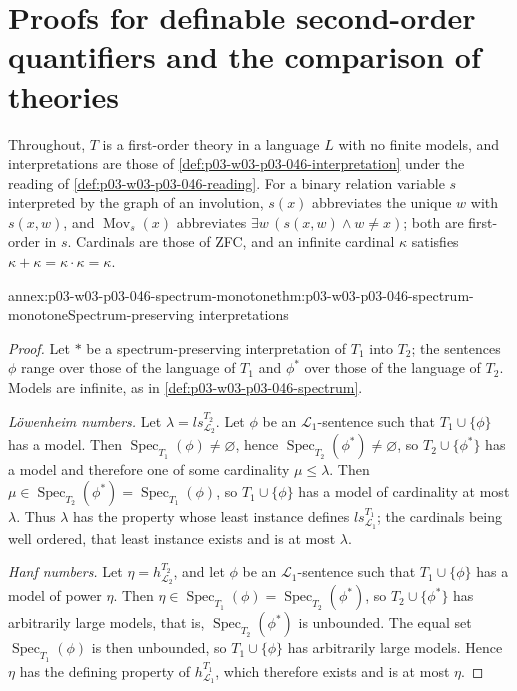 \section{Proofs for definable second-order quantifiers and the comparison of theories}
\label{sec:annex-p03-w03-p03-046-dsoq}

Throughout, \(T\) is a first-order theory in a language \(L\) with no finite
models, and interpretations are those of
\cref{def:p03-w03-p03-046-interpretation} under the reading of
\cref{def:p03-w03-p03-046-reading}. For a binary relation variable \(s\)
interpreted by the graph of an involution, \(s(x)\) abbreviates the unique
\(w\) with \(s(x,w)\), and \(\operatorname{Mov}_s(x)\) abbreviates
\(\exists w\,(s(x,w)\wedge w\neq x)\); both are first-order in \(s\).
Cardinals are those of ZFC, and an infinite cardinal \(\kappa\) satisfies
\(\kappa+\kappa=\kappa\cdot\kappa=\kappa\).

\begin{annexitem}{annex:p03-w03-p03-046-spectrum-monotone}{thm:p03-w03-p03-046-spectrum-monotone}{Spectrum-preserving interpretations}
\begin{proof}
Let \(*\) be a spectrum-preserving interpretation of \(T_1\) into \(T_2\);
the sentences \(\phi\) range over those of the language of \(T_1\) and
\(\phi^*\) over those of the language of \(T_2\). Models are infinite, as
in \cref{def:p03-w03-p03-046-spectrum}.

\emph{L\"owenheim numbers.} Let \(\lambda=ls^{T_2}_{\mathscr L_2}\). Let
\(\phi\) be an \(\mathscr L_1\)-sentence such that \(T_1\cup\{\phi\}\) has a
model. Then \(\operatorname{Spec}_{T_1}(\phi)\neq\varnothing\), hence
\(\operatorname{Spec}_{T_2}(\phi^*)\neq\varnothing\), so
\(T_2\cup\{\phi^*\}\) has a model and therefore one of some cardinality
\(\mu\le\lambda\). Then
\(\mu\in\operatorname{Spec}_{T_2}(\phi^*)=\operatorname{Spec}_{T_1}(\phi)\),
so \(T_1\cup\{\phi\}\) has a model of cardinality at most \(\lambda\). Thus
\(\lambda\) has the property whose least instance defines
\(ls^{T_1}_{\mathscr L_1}\); the cardinals being well ordered, that least
instance exists and is at most \(\lambda\).

\emph{Hanf numbers.} Let \(\eta=h^{T_2}_{\mathscr L_2}\), and let \(\phi\)
be an \(\mathscr L_1\)-sentence such that \(T_1\cup\{\phi\}\) has a model
of power \(\eta\). Then
\(\eta\in\operatorname{Spec}_{T_1}(\phi)=\operatorname{Spec}_{T_2}(\phi^*)\),
so \(T_2\cup\{\phi^*\}\) has arbitrarily large models, that is,
\(\operatorname{Spec}_{T_2}(\phi^*)\) is unbounded. The equal set
\(\operatorname{Spec}_{T_1}(\phi)\) is then unbounded, so
\(T_1\cup\{\phi\}\) has arbitrarily large models. Hence \(\eta\) has the
defining property of \(h^{T_1}_{\mathscr L_1}\), which therefore exists and
is at most \(\eta\).
\end{proof}
\end{annexitem}


